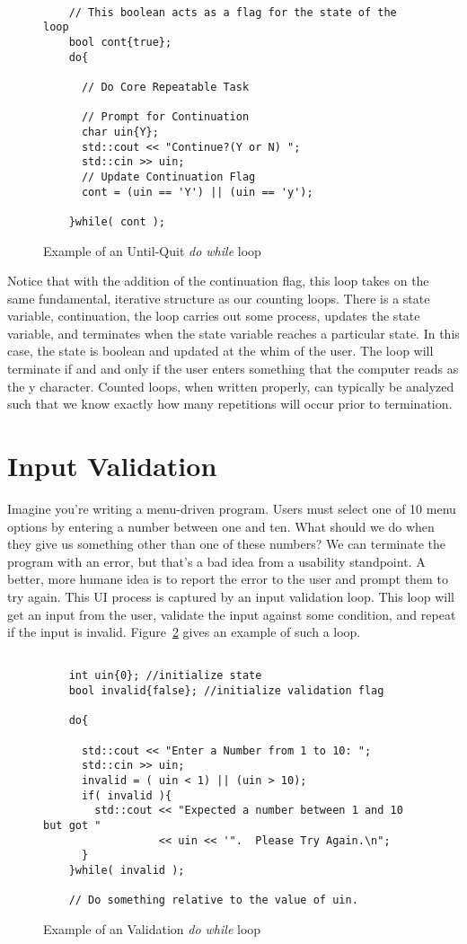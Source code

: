 \documentclass[]{tufte-handout}
\begin{document}
\begin{figure}
  \begin{lstlisting}

    // This boolean acts as a flag for the state of the loop
    bool cont{true};
    do{

      // Do Core Repeatable Task

      // Prompt for Continuation
      char uin{Y};
      std::cout << "Continue?(Y or N) ";
      std::cin >> uin;
      // Update Continuation Flag
      cont = (uin == 'Y') || (uin == 'y');

    }while( cont );
  \end{lstlisting}
  \caption{Example of an Until-Quit \textit{do while} loop}
\label{loop:untilquit}
\end{figure}

Notice that with the addition of the continuation flag, this loop takes on the same fundamental, iterative structure as our counting loops. There is a state variable, continuation, the loop carries out some process, updates the state variable, and terminates when the state variable reaches a particular state. In this case, the state is boolean and updated at the whim of the user. The loop will terminate if and and only if the user enters something that the computer reads as the y character. Counted loops, when written properly, can typically be analyzed such that we know exactly how many repetitions will occur prior to termination.

\section{Input Validation}

Imagine you're writing a menu-driven program. Users must select one of 10 menu options by entering a number between one and ten. What should we do when they give us something other than one of these numbers?  We can terminate the program with an error, but that's a bad idea from a usability standpoint.  A better, more humane idea is to report the error to the user and prompt them to try again. This UI process is captured by an input validation loop. This loop will get an input from the user, validate the input against some condition, and repeat if the input is invalid.  Figure~\ref{loop:validation} gives an example of such a loop.

\begin{figure}
  \begin{lstlisting}

    int uin{0}; //initialize state
    bool invalid{false}; //initialize validation flag

    do{

      std::cout << "Enter a Number from 1 to 10: ";
      std::cin >> uin;
      invalid = ( uin < 1) || (uin > 10);
      if( invalid ){
        std::cout << "Expected a number between 1 and 10 but got "
                  << uin << '".  Please Try Again.\n";
      }
    }while( invalid );

    // Do something relative to the value of uin.
  \end{lstlisting}
  \caption{Example of an Validation \textit{do while} loop}
\label{loop:validation}
\end{figure}
\end{document}
